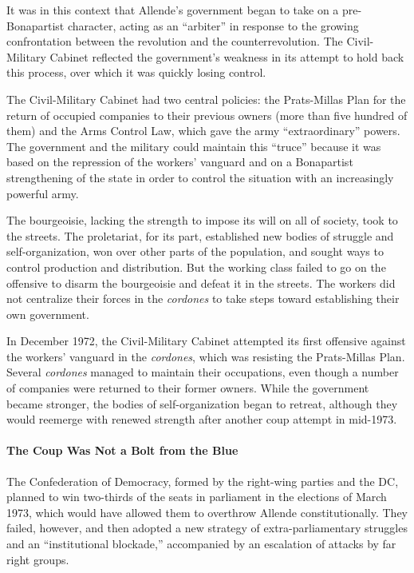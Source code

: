 It was in this context that Allende's government began to take on a pre-Bonapartist character, acting as an ``arbiter'' in response to the growing confrontation between the revolution and the counterrevolution. The Civil-Military Cabinet reflected the government's weakness in its attempt to hold back this process, over which it was quickly losing control.

The Civil-Military Cabinet had two central policies: the Prats-Millas Plan for the return of occupied companies to their previous owners (more than five hundred of them) and the Arms Control Law, which gave the army ``extraordinary'' powers. The government and the military could maintain this ``truce'' because it was based on the repression of the workers' vanguard and on a Bonapartist strengthening of the state in order to control the situation with an increasingly powerful army.

The bourgeoisie, lacking the strength to impose its will on all of society, took to the streets. The proletariat, for its part, established new bodies of struggle and self-organization, won over other parts of the population, and sought ways to control production and distribution. But the working class failed to go on the offensive to disarm the bourgeoisie and defeat it in the streets. The workers did not centralize their forces in the \emph{cordones} to take steps toward establishing their own government.

In December 1972, the Civil-Military Cabinet attempted its first offensive against the workers' vanguard in the \emph{cordones}, which was resisting the Prats-Millas Plan. Several \emph{cordones} managed to maintain their occupations, even though a number of companies were returned to their former owners. While the government became stronger, the bodies of self-organization began to retreat, although they would reemerge with renewed strength after another coup attempt in mid-1973.

\paragraph{The Coup Was Not a Bolt from the Blue}

The Confederation of Democracy, formed by the right-wing parties and the DC, planned to win two-thirds of the seats in parliament in the elections of March 1973, which would have allowed them to overthrow Allende constitutionally. They failed, however, and then adopted a new strategy of extra-parliamentary struggles and an ``institutional blockade,'' accompanied by an escalation of attacks by far right groups.

